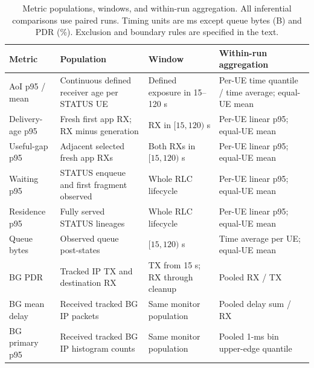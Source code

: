 \begin{table}[htbp]
\caption{Metric populations, windows, and within-run aggregation. All inferential comparisons use paired runs. Timing units are ms except queue bytes (B) and PDR (\%). Exclusion and boundary rules are specified in the text.}\label{tab:metrics}
\small\begin{tabularx}{\textwidth}{>{\raggedright\arraybackslash}p{}>{\raggedright\arraybackslash}p{}>{\raggedright\arraybackslash}p{}>{\raggedright\arraybackslash}X}\toprule
Metric & Population & Window & Within-run aggregation \\\midrule
AoI p95 / mean & Continuous defined receiver age per STATUS UE & Defined exposure in 15--120 s & Per-UE time quantile / time average; equal-UE mean \\
Delivery-age p95 & Fresh first app RX; RX minus generation & RX in $[15,120)$ s & Per-UE linear p95; equal-UE mean \\
Useful-gap p95 & Adjacent selected fresh app RXs & Both RXs in $[15,120)$ s & Per-UE linear p95; equal-UE mean \\
Waiting p95 & STATUS enqueue and first fragment observed & Whole RLC lifecycle & Per-UE linear p95; equal-UE mean \\
Residence p95 & Fully served STATUS lineages & Whole RLC lifecycle & Per-UE linear p95; equal-UE mean \\
Queue bytes & Observed queue post-states & $[15,120)$ s & Time average per UE; equal-UE mean \\
BG PDR & Tracked IP TX and destination RX & TX from 15 s; RX through cleanup & Pooled RX / TX \\
BG mean delay & Received tracked BG IP packets & Same monitor population & Pooled delay sum / RX \\
BG primary p95 & Received tracked BG IP histogram counts & Same monitor population & Pooled 1-ms bin upper-edge quantile \\
\bottomrule\end{tabularx}
\end{table}
